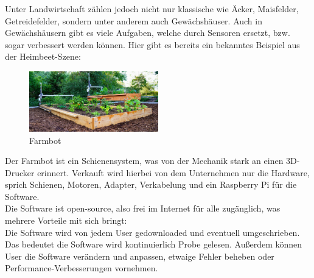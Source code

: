 Unter Landwirtschaft zählen jedoch nicht nur klassische wie Äcker, Maisfelder, Getreidefelder, sondern unter anderem auch Gewächshäuser. Auch in Gewächshäusern gibt es viele Aufgaben, welche durch Sensoren ersetzt, bzw. sogar verbessert werden können.
Hier gibt es bereits ein bekanntes Beispiel aus der Heimbeet-Szene:\\

\begin{figure}[ht]
	\centering
	\includegraphics[width=0.5\textwidth]{bilder/farmbot.png}
	\caption[Farmbot]{Farmbot}
	\label{fig:farmbot}
\end{figure}

Der Farmbot ist ein Schienensystem, was von der Mechanik stark an einen 3D-Drucker erinnert. Verkauft wird hierbei von dem Unternehmen nur die Hardware, sprich Schienen, Motoren, Adapter, Verkabelung und ein Raspberry Pi für die Software.\\
Die Software ist open-source, also frei im Internet für alle zugänglich, was mehrere Vorteile mit sich bringt:\\
Die Software wird von jedem User gedownloaded und eventuell umgeschrieben. Das bedeutet die Software wird kontinuierlich Probe gelesen. Außerdem können User die Software verändern und anpassen, etwaige Fehler beheben oder Performance-Verbesserungen vornehmen.